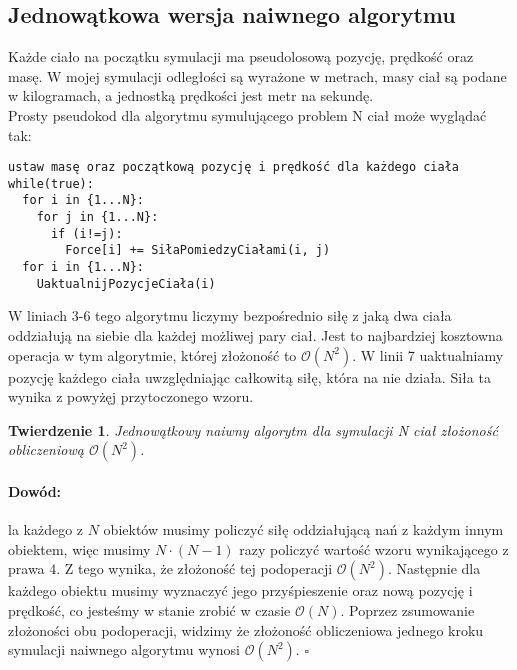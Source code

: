 \documentclass[14pt,twoside,a4paper]{article}
\newenvironment{myproof}[2] {\paragraph{Dowód:}}{\hfill$\square$}
\newcommand\tab[1][1cm]{\hspace*{#1}}
\begin{document}
\subsection{\Large Jednowątkowa wersja naiwnego algorytmu}

Każde ciało na początku symulacji ma pseudolosową pozycję, prędkość oraz masę. W mojej symulacji odległości są wyrażone w metrach, masy ciał są podane w kilogramach, a jednostką prędkości jest metr na sekundę. \\


Prosty pseudokod dla algorytmu symulującego problem N ciał może wyglądać tak:\\
\bigskip


\begin{lstlisting}[frame=single, framerule=2pt, caption=Pseudokod naiwnego algorytmu]
ustaw masę oraz początkową pozycję i prędkość dla każdego ciała
while(true):
  for i in {1...N}:
    for j in {1...N}:
      if (i!=j):
        Force[i] += SiłaPomiedzyCiałami(i, j) 
  for i in {1...N}:
    UaktualnijPozycjeCiała(i)
\end{lstlisting}

\bigskip

W liniach 3-6 tego algorytmu liczymy bezpośrednio siłę z jaką dwa ciała oddziałują na siebie dla każdej możliwej pary ciał. Jest to najbardziej kosztowna operacja w tym algorytmie, której złożoność to $\mathcal{O}(N^{2})$. W linii 7 uaktualniamy pozycję każdego ciała uwzględniając całkowitą siłę, która na nie działa. Siła ta wynika z powyżęj przytoczonego wzoru. 
\bigskip
\newtheorem{twr}{Twierdzenie}
\begin{twr}
Jednowątkowy naiwny algorytm dla symulacji N ciał złożoność obliczeniową $\mathcal{O}(N^{2})$.
\end{twr}

\begin{myproof}

\tab Dla każdego z $N$ obiektów musimy policzyć siłę oddziałującą nań z każdym innym obiektem, więc musimy $N\cdot (N-1)$ razy policzyć wartość wzoru wynikającego z prawa $4$. Z tego wynika, że złożoność tej podoperacji $\mathcal{O}(N^{2})$. 
Następnie dla każdego obiektu musimy wyznaczyć jego przyśpieszenie oraz nową pozycję i prędkość, co jesteśmy w stanie zrobić w czasie $\mathcal{O}(N)$.
Poprzez zsumowanie złożoności obu podoperacji, widzimy że złożoność obliczeniowa jednego kroku symulacji naiwnego algorytmu wynosi $\mathcal{O}(N^{2})$.
\end{myproof}
\end{document}
